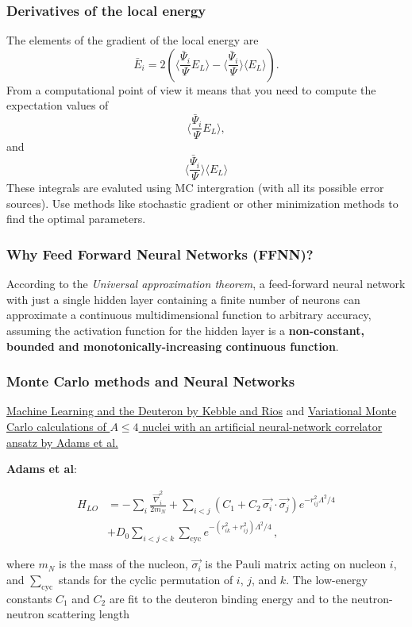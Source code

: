 \documentclass{beamer}
\begin{document}
\begin{frame}
\frametitle{Derivatives of the local energy}

\begin{block}{}
The elements of the gradient of the local energy are 
\[
\bar{E}_{i}= 2\left( \langle \frac{\bar{\Psi}_{i}}{\Psi}E_L\rangle -\langle \frac{\bar{\Psi}_{i}}{\Psi}\rangle\langle E_L \rangle\right).
\]
From a computational point of view it means that you need to compute the expectation values of 
\[
\langle \frac{\bar{\Psi}_{i}}{\Psi}E_L\rangle,
\]
and
\[
\langle \frac{\bar{\Psi}_{i}}{\Psi}\rangle\langle E_L\rangle
\]
These integrals are evaluted using MC intergration (with all its possible error sources). Use methods like stochastic gradient or other minimization methods to find the optimal parameters.
\end{block}
\end{frame}

\begin{frame}
\frametitle{Why Feed Forward Neural Networks (FFNN)?}

According to the \emph{Universal approximation theorem}, a feed-forward
neural network with just a single hidden layer containing a finite
number of neurons can approximate a continuous multidimensional
function to arbitrary accuracy, assuming the activation function for
the hidden layer is a \textbf{non-constant, bounded and
monotonically-increasing continuous function}.
\end{frame}

\begin{frame}
\frametitle{Monte Carlo methods and Neural Networks}

\href{{https://www.sciencedirect.com/science/article/pii/S0370269320305463?via%3Dihub}}{Machine Learning and the Deuteron by Kebble and Rios} and
\href{{https://journals.aps.org/prl/abstract/10.1103/PhysRevLett.127.022502}}{Variational Monte Carlo calculations of $A\le 4$ nuclei with an artificial neural-network correlator ansatz by Adams et al.}

\textbf{Adams et al}:

\begin{align}
H_{LO} &=-\sum_i \frac{{\vec{\nabla}_i^2}}{2m_N}
+\sum_{i<j} {\left(C_1  + C_2\, \vec{\sigma_i}\cdot\vec{\sigma_j}\right)
e^{-r_{ij}^2\Lambda^2 / 4 }}
\nonumber\\
&+D_0 \sum_{i<j<k} \sum_{\text{cyc}}
{e^{-\left(r_{ik}^2+r_{ij}^2\right)\Lambda^2/4}}\,,
\end{align}

where $m_N$ is the mass of the nucleon, $\vec{\sigma_i}$ is the Pauli
matrix acting on nucleon $i$, and $\sum_{\text{cyc}}$ stands for the
cyclic permutation of $i$, $j$, and $k$. The low-energy constants
$C_1$ and $C_2$ are fit to the deuteron binding energy and to the
neutron-neutron scattering length
\end{frame}
\end{document}
